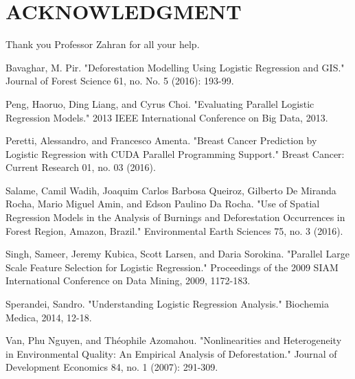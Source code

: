 \documentclass[letterpaper, 10 pt, conference]{ieeeconf}  %
\begin{document}

\section*{ACKNOWLEDGMENT}

Thank you Professor Zahran for all your help.

\begin{thebibliography}{99}


 Bavaghar, M. Pir. "Deforestation Modelling Using Logistic Regression and GIS." Journal of Forest Science 61, no. No. 5 (2016): 193-99. 

 Peng, Haoruo, Ding Liang, and Cyrus Choi. "Evaluating Parallel Logistic Regression Models." 2013 IEEE International Conference on Big Data, 2013. 

 Peretti, Alessandro, and Francesco Amenta. "Breast Cancer Prediction by Logistic Regression with CUDA Parallel Programming Support." Breast Cancer: Current Research 01, no. 03 (2016).

 Salame, Camil Wadih, Joaquim Carlos Barbosa Queiroz, Gilberto De Miranda Rocha, Mario Miguel Amin, and Edson Paulino Da Rocha. "Use of Spatial Regression Models in the Analysis of Burnings and Deforestation Occurrences in Forest Region, Amazon, Brazil." Environmental Earth Sciences 75, no. 3 (2016). 

 Singh, Sameer, Jeremy Kubica, Scott Larsen, and Daria Sorokina. "Parallel Large Scale Feature Selection for Logistic Regression." Proceedings of the 2009 SIAM International Conference on Data Mining, 2009, 1172-183. 

 Sperandei, Sandro. "Understanding Logistic Regression Analysis." Biochemia Medica, 2014, 12-18.

 Van, Phu Nguyen, and Théophile Azomahou. "Nonlinearities and Heterogeneity in Environmental Quality: An Empirical Analysis of Deforestation." Journal of Development Economics 84, no. 1 (2007): 291-309. 






\end{thebibliography}
\end{document}
